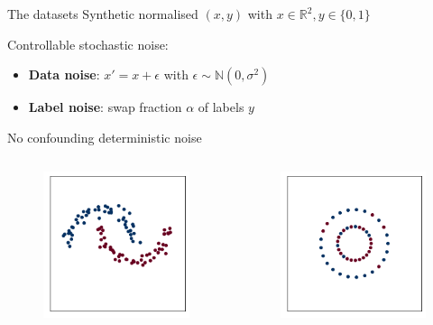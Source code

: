 \documentclass[9.5pt]{beamer}
\begin{document}
    \begin{frame}{The datasets}
        Synthetic normalised $(x, y)$ with $x \in \mathbb{R}^2, y \in \{0, 1\}$

        Controllable stochastic noise:
        \begin{itemize}
            \item \textbf{Data noise}: $x' = x + \epsilon$ with $\epsilon \sim \mathbb{N}(0, \sigma^2)$
            \item \textbf{Label noise}: swap fraction $\alpha$ of labels $y$
        \end{itemize}

        No confounding deterministic noise

        \begin{columns}[onlytextwidth]
            \begin{figure}
                \centering
                \includegraphics[width=0.7\linewidth]{images/moons}
            \end{figure}
            \begin{figure}
                \centering
                \includegraphics[width=0.7\linewidth]{images/circles}
            \end{figure}
        \end{columns}
    \end{frame}
\end{document}
